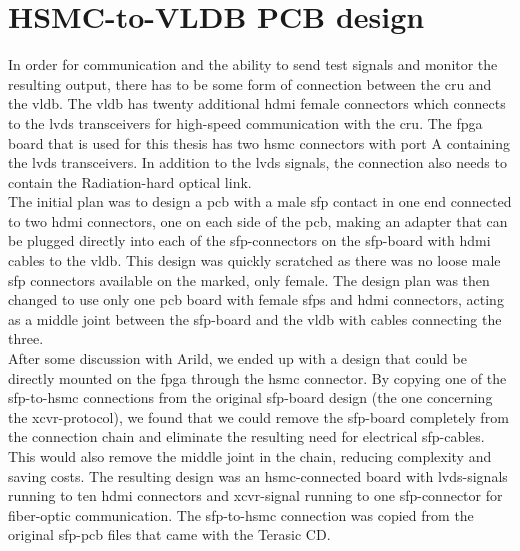 \documentclass[main.tex]{subfiles}
\begin{document}
\chapter{HSMC-to-VLDB PCB design} \label{chap:pcb}

In order for communication and the ability to send test signals and monitor the resulting output, there has to be some form of connection between the \gls{cru} and the \gls{vldb}. The \gls{vldb} has twenty additional \acrshort{hdmi} female connectors which connects to the \gls{lvds} transceivers for high-speed communication with the \gls{cru}. The \gls{fpga} board that is used for this thesis has two \gls{hsmc} connectors with port A containing the \gls{lvds} transceivers. In addition to the \gls{lvds} signals, the connection also needs to contain the Radiation-hard optical link.\\

The initial plan was to design a \gls{pcb} with a male \gls{sfp} contact in one end connected to two \gls{hdmi} connectors, one on each side of the \gls{pcb}, making an adapter that can be plugged directly into each of the \gls{sfp}-connectors on the \gls{sfp}-board with \gls{hdmi} cables to the \gls{vldb}. This design was quickly scratched as there was no loose male \gls{sfp} connectors available on the marked, only female. The design plan was then changed to use only one \gls{pcb} board with female \glspl{sfp} and \gls{hdmi} connectors, acting as a middle joint between the \gls{sfp}-board and the \gls{vldb} with cables connecting the three. \\

After some discussion with Arild, we ended up with a design that could be directly mounted on the \gls{fpga} through the \gls{hsmc} connector. By copying one of the \gls{sfp}-to-\gls{hsmc} connections from the original \gls{sfp}-board design (the one concerning the \gls{xcvr}-protocol), we found that we could remove the \gls{sfp}-board completely from the connection chain and eliminate the resulting need for electrical \gls{sfp}-cables. This would also remove the middle joint in the chain, reducing complexity and saving costs. The resulting design was an \gls{hsmc}-connected board with \gls{lvds}-signals running to ten \gls{hdmi} connectors and \gls{xcvr}-signal running to one \gls{sfp}-connector for fiber-optic communication. The \gls{sfp}-to-\gls{hsmc} connection was copied from the original \gls{sfp}-\gls{pcb} files that came with the Terasic CD.
\end{document}
